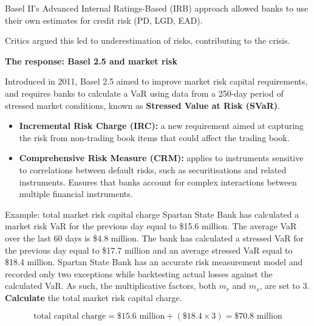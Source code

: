 


\begin{lettered}
\item Basel II's Advanced Internal Ratings-Based (IRB) approach allowed banks to
use their own estimates for credit risk (PD, LGD, EAD).
\item Critics argued this led to underestimation of risks, contributing to the
crisis.
\end{lettered}

\begin{orkeybox}
{\sffamily\bfseries\fontsize{8.6}{10}\selectfont\color{navy}The response: Basel
2.5 and market risk}\par
\vspace{2pt}
Introduced in 2011, Basel 2.5 aimed to improve market risk capital requirements,
and requires banks to calculate a VaR using data from a 250-day period of stressed
market conditions, known as \textbf{Stressed Value at Risk (SVaR)}.
\end{orkeybox}

\begin{itemize}
\item \textbf{Incremental Risk Charge (IRC):} a new requirement aimed at capturing
the risk from non-trading book items that could affect the trading book.
\item \textbf{Comprehensive Risk Measure (CRM):} applies to instruments sensitive
to correlations between default risks, such as securitisations and related
instruments. Ensures that banks account for complex interactions between multiple
financial instruments.
\end{itemize}

\begin{orexambox}{Example: total market risk capital charge}
Spartan State Bank has calculated a market risk VaR for the previous day equal to
\$15.6 million. The average VaR over the last 60 days is \$4.8 million. The bank
has calculated a stressed VaR for the previous day equal to \$17.7 million and an
average stressed VaR equal to \$18.4 million. Spartan State Bank has an accurate
risk measurement model and recorded only two exceptions while backtesting actual
losses against the calculated VaR. As such, the multiplicative factors, both $m_r$
and $m_s$, are set to 3. \textbf{Calculate} the total market risk capital charge.

\vspace{6pt}
\par
\[
\text{total capital charge}=\$15.6\text{ million}+(\$18.4\times3)=\$70.8\text{ million}
\]
\end{orexambox}

